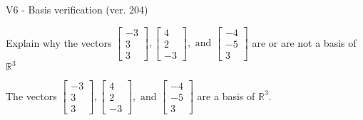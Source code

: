 \begin{exercise}
  \begin{exerciseTitle}V6 - Basis verification (ver. 204)\end{exerciseTitle}
  \begin{exerciseStatement}
    Explain why the vectors \(\left[\begin{array}{r}
-3 \\
3 \\
3
\end{array}\right] , \left[\begin{array}{r}
4 \\
2 \\
-3
\end{array}\right] , \text{ and } \left[\begin{array}{r}
-4 \\
-5 \\
3
\end{array}\right]\) are or are not a basis of \(\mathbb{R}^3\)	


  \end{exerciseStatement}
  \begin{exerciseAnswer}
   The vectors \(\left[\begin{array}{r}
-3 \\
3 \\
3
\end{array}\right] , \left[\begin{array}{r}
4 \\
2 \\
-3
\end{array}\right] , \text{ and } \left[\begin{array}{r}
-4 \\
-5 \\
3
\end{array}\right]\) 
  	 are  a basis of \(\mathbb{R}^3\).
  


  \end{exerciseAnswer}
\end{exercise}